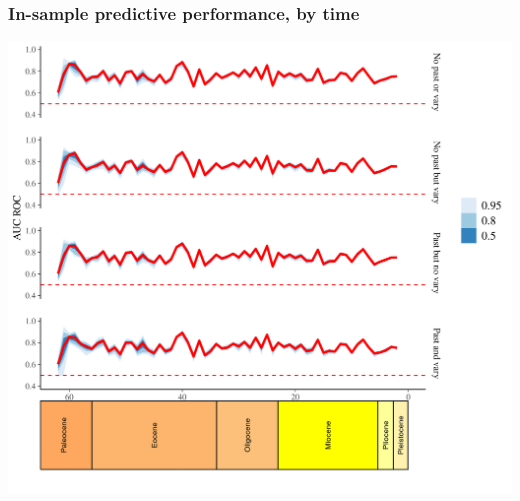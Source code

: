 \documentclass{beamer}
\begin{document}
\begin{frame}
  \frametitle{In-sample predictive performance, by time}

  \begin{center}
    \includegraphics[width=\textwidth,height=0.8\textheight,keepaspectratio=true]{../results/figure/auc_ts}
  \end{center}

\end{frame}
\end{document}
